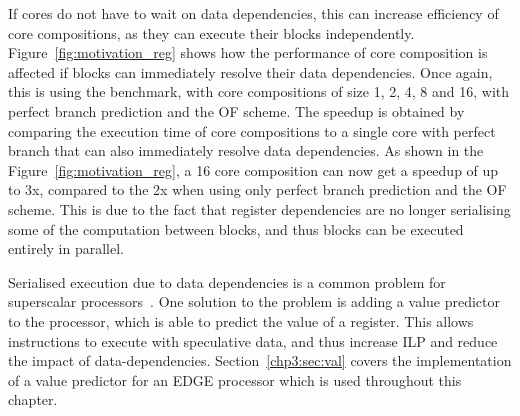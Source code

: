 If cores do not have to wait on data dependencies, this can increase efficiency of core compositions, as they can execute their blocks independently.
Figure~\ref{fig:motivation_reg} shows how the performance of core composition is affected if blocks can immediately resolve their data dependencies.
Once again, this is using the  benchmark, with core compositions of size 1, 2, 4, 8 and 16, with perfect branch prediction and the OF scheme.
The speedup is obtained by comparing the execution time of core compositions to a single core with perfect branch that can also immediately resolve data dependencies.
As shown in the Figure~\ref{fig:motivation_reg}, a 16 core composition can now get a speedup of up to 3x, compared to the 2x when using only perfect branch prediction and the OF scheme.
This is due to the fact that register dependencies are no longer serialising some of the computation between blocks, and thus blocks can be executed entirely in parallel.

Serialised execution due to data dependencies is a common problem for superscalar processors~\cite{peraisVTAGE2014}.
One solution to the problem is adding a value predictor to the processor, which is able to predict the value of a register.
This allows instructions to execute with speculative data, and thus increase ILP and reduce the impact of data-dependencies.
Section~\ref{chp3:sec:val} covers the implementation of a value predictor for an EDGE processor which is used throughout this chapter.






